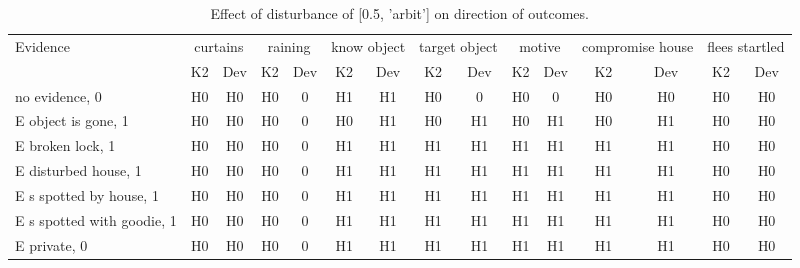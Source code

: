 \begin{table}\begin{tabular}{l|cc|cc|cc|cc|cc|cc|cc}\toprule\multirow{2}{*}{Evidence} & \multicolumn{2}{c}{curtains}& \multicolumn{2}{c}{raining}& \multicolumn{2}{c}{know object}& \multicolumn{2}{c}{target object}& \multicolumn{2}{c}{motive}& \multicolumn{2}{c}{compromise house}& \multicolumn{2}{c}{flees startled}\\& {K2} & {Dev}& {K2} & {Dev}& {K2} & {Dev}& {K2} & {Dev}& {K2} & {Dev}& {K2} & {Dev}& {K2} & {Dev}\\\midrule
no evidence, 0 & H0&H0&\cellcolor{Bittersweet}H0&\cellcolor{Bittersweet}0&H1&H1&\cellcolor{Bittersweet}H0&\cellcolor{Bittersweet}0&\cellcolor{Bittersweet}H0&\cellcolor{Bittersweet}0&H0&H0&H0&H0\\E object is gone, 1 & H0&H0&\cellcolor{Bittersweet}H0&\cellcolor{Bittersweet}0&\cellcolor{Bittersweet}H0&\cellcolor{Bittersweet}H1&\cellcolor{Bittersweet}H0&\cellcolor{Bittersweet}H1&\cellcolor{Bittersweet}H0&\cellcolor{Bittersweet}H1&\cellcolor{Bittersweet}H0&\cellcolor{Bittersweet}H1&H0&H0\\E broken lock, 1 & H0&H0&\cellcolor{Bittersweet}H0&\cellcolor{Bittersweet}0&H1&H1&H1&H1&H1&H1&H1&H1&H0&H0\\E disturbed house, 1 & H0&H0&\cellcolor{Bittersweet}H0&\cellcolor{Bittersweet}0&H1&H1&H1&H1&H1&H1&H1&H1&H0&H0\\E s spotted by house, 1 & H0&H0&\cellcolor{Bittersweet}H0&\cellcolor{Bittersweet}0&H1&H1&H1&H1&H1&H1&H1&H1&H0&H0\\E s spotted with goodie, 1 & H0&H0&\cellcolor{Bittersweet}H0&\cellcolor{Bittersweet}0&H1&H1&H1&H1&H1&H1&H1&H1&H0&H0\\E private, 0 & H0&H0&\cellcolor{Bittersweet}H0&\cellcolor{Bittersweet}0&H1&H1&H1&H1&H1&H1&H1&H1&H0&H0\\\bottomrule\end{tabular}\caption{Effect of disturbance of [0.5, 'arbit'] on direction of outcomes.}\end{table}